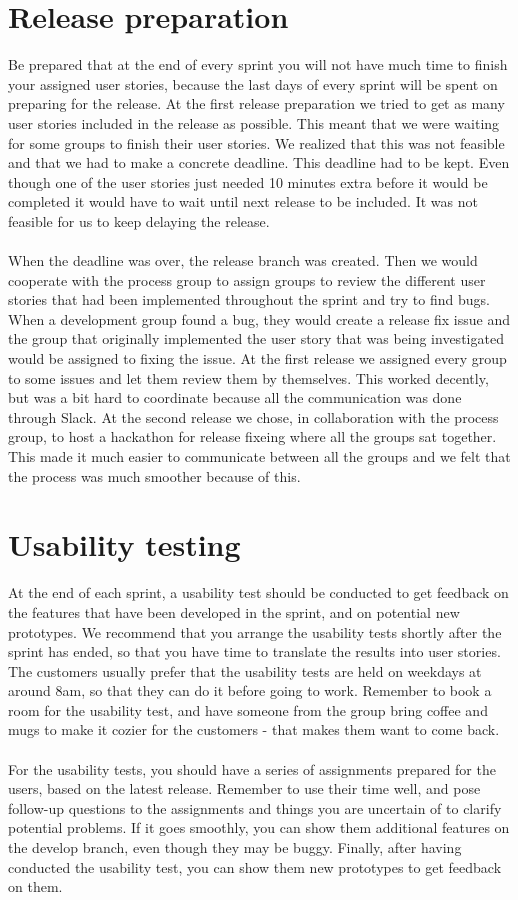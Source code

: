 \section{Release preparation}
Be prepared that at the end of every sprint you will not have much time to finish your assigned user stories, because the last days of every sprint will be spent on preparing for the release.
At the first release preparation we tried to get as many user stories included in the release as possible.
This meant that we were waiting for some groups to finish their user stories.
We realized that this was not feasible and that we had to make a concrete deadline.
This deadline had to be kept.
Even though one of the user stories just needed 10 minutes extra before it would be completed it would have to wait until next release to be included.
It was not feasible for us to keep delaying the release.
\\\\
When the deadline was over, the release branch was created.
Then we would cooperate with the process group to assign groups to review the different user stories that had been implemented throughout the sprint and try to find bugs.
When a development group found a bug, they would create a release fix issue and the group that originally implemented the user story that was being investigated would be assigned to fixing the issue.
At the first release we assigned every group to some issues and let them review them by themselves.
This worked decently, but was a bit hard to coordinate because all the communication was done through Slack.
At the second release we chose, in collaboration with the process group, to host a hackathon for release fixeing where all the groups sat together.
This made it much easier to communicate between all the groups and we felt that the process was much smoother because of this.

\section{Usability testing}
At the end of each sprint, a usability test should be conducted to get feedback on the features that have been developed in the sprint, and on potential new prototypes.
We recommend that you arrange the usability tests shortly after the sprint has ended, so that you have time to translate the results into user stories.
The customers usually prefer that the usability tests are held on weekdays at around 8am, so that they can do it before going to work.
Remember to book a room for the usability test, and have someone from the group bring coffee and mugs to make it cozier for the customers - that makes them want to come back.
\\\\
For the usability tests, you should have a series of assignments prepared for the users, based on the latest release.
Remember to use their time well, and pose follow-up questions to the assignments and things you are uncertain of to clarify potential problems.
If it goes smoothly, you can show them additional features on the develop branch, even though they may be buggy.
Finally, after having conducted the usability test, you can show them new prototypes to get feedback on them. 

